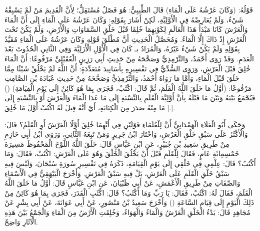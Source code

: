 قَوْلُهُ: (وَكَانَ عَرْشُهُ عَلَى الْمَاءِ) قَالَ الطِّيبِيُّ: هُوَ فَصْلٌ مُسْتَقِلٌّ؛ لِأَنَّ الْقَدِيمَ مَنْ لَمْ يَسْبِقْهُ شَيْءٌ، وَلَمْ يُعَارِضْهُ فِي الْأَوَّلِيَّةِ، لَكِنْ أَشَارَ بِقَوْلِهِ: وَكَانَ عَرْشُهُ عَلَى الْمَاءِ إِلَى أَنَّ الْمَاءَ وَالْعَرْشَ كَانَا مَبْدَأُ هَذَا الْعَالَمِ لِكَوْنِهِمَا خُلِقَا قَبْلَ خَلْقِ السَّمَاوَاتِ وَالْأَرْضِ، وَلَمْ يَكُنْ تَحْتَ الْعَرْشِ إِذْ ذَاكَ إِلَّا الْمَاءُ. وَمُحَصَّلُ الْحَدِيثِ أَنَّ مُطْلَقَ قَوْلِهِ وَكَانَ عَرْشُهُ عَلَى الْمَاءِ مُقَيَّدٌ بِقَوْلِهِ وَلَمْ يَكُنْ شَيْءٌ غَيْرُهُ، وَالْمُرَادُ بـ كَانَ فِي الْأَوَّلِ الْأَزَلِيَّةَ وَفِي الثَّانِيِ الْحُدُوثَ بَعْدَ الْعَدَمِ. وَقَدْ رَوَى أَحْمَدُ، وَالتِّرْمِذِيُّ وَصَحَّحَهُ مِنْ حَدِيثِ أَبِي رَزِينٍ الْعُقَيْلِيِّ مَرْفُوعًا: أَنَّ الْمَاءَ خُلِقَ قَبْلَ الْعَرْشِ، وَرَوَى السُّدِّيُّ فِي تَفْسِيرِهِ بِأَسَانِيدَ مُتَعَدِّدَةٍ: أَنَّ اللَّهَ لَمْ يَخْلُقْ شَيْئًا مِمَّا خَلَقَ قَبْلَ الْمَاءِ، وَأَمَّا مَا رَوَاهُ أَحْمَدُ، وَالتِّرْمِذِيُّ وَصَحَّحَهُ مِنْ حَدِيثِ عُبَادَةَ بْنِ الصَّامِتِ مَرْفُوعًا: (أَوَّلُ مَا خَلَقَ اللَّهُ الْقَلَمَ، ثُمَّ قَالَ: اكْتُبْ، فَجَرَى بِمَا هُوَ كَائِنٌ إِلَى يَوْمِ الْقِيَامَةِ) () فَيُجْمَعُ بَيْنَهُ وَبَيْنَ مَا قَبْلَهُ بِأَنَّ أَوَّلِيَّةَ الْقَلَمِ بِالنِّسْبَةِ إِلَى مَا عَدَا الْمَاءَ وَالْعَرْشَ أَوْ بِالنِّسْبَةِ إِلَى مَا مِنْهُ صَدَرَ مِنَ الْكِتَابَةِ، أَيْ أَنَّهُ قِيلَ لَهُ اكْتُبْ أَوَّلَ مَا خُلِقَ [.].

وَحَكَى أَبُو الْعَلَاءِ الْهَمْدَانِيُّ أَنَّ لِلْعُلَمَاءِ قَوْلَيْنِ فِي أَيِّهِمَا خُلِقَ أَوَّلًا الْعَرْشُ أَوِ الْقَلَمُ؟ قَالَ: وَالْأَكْثَرُ عَلَى سَبْقِ خَلْقِ الْعَرْشِ، وَاخْتَارَ ابْنُ جَرِيرٍ وَمَنْ تَبِعَهُ الثَّانِي، وَرَوَى ابْنُ أَبِي حَازِمٍ مِنْ طَرِيقِ سَعِيدِ بْنِ جُبَيْرٍ، عَنِ ابْنِ عَبَّاسٍ قَالَ: خَلَقَ اللَّهُ اللَّوْحَ الْمَحْفُوظَ مَسِيرَةَ خَمْسِمِائَةِ عَامٍ، فَقَالَ لِلْقَلَمِ قَبْلَ أَنْ يَخْلُقَ الْخَلْقَ وَهُوَ عَلَى الْعَرْشِ: اكْتُبْ، فَقَالَ: وَمَا أَكْتُبُ؟ قَالَ: عِلْمِي فِي خَلْقِي إِلَى يَوْمِ الْقِيَامَةِ، ذَكَرَهُ فِي تَفْسِيرِ سُورَةِ سُبْحَانَ، وَلَيْسَ فِيهِ سَبْقُ خَلْقِ الْقَلَمِ عَلَى الْعَرْشِ، بَلْ فِيهِ سَبْقُ الْعَرْشِ. وَأَخْرَجَ الْبَيْهَقِيُّ فِي الْأَسْمَاءِ وَالصِّفَاتِ مِنْ طَرِيقِ الْأَعْمَشِ، عَنْ أَبِي ظَبْيَانَ، عَنِ ابْنِ عَبَّاسٍ قَالَ: أَوَّلُ مَا خَلَقَ اللَّهُ الْقَلَمَ، فَقَالَ لَهُ: اكْتُبْ، فَقَالَ: يَا رَبِّ وَمَا أَكْتُبُ؟ قَالَ: اكْتُبِ الْقَدَرَ، فَجَرَى بِمَا هُوَ كَائِنٌ مِنْ ذَلِكَ الْيَوْمِ إِلَى قِيَامِ السَّاعَةِ () وَأَخْرَجَ سَعِيدُ بْنُ مَنْصُورٍ، عَنْ أَبِي عَوَانَةَ، عَنْ أَبِي بِشْرٍ عَنْ مُجَاهِدٍ قَالَ: بَدْءُ الْخَلْقِ الْعَرْشُ وَالْمَاءُ وَالْهَوَاءُ، وَخُلِقَتِ الْأَرْضُ مِنَ الْمَاءِ وَالْجَمْعُ بَيْنَ هَذِهِ الْآثَارِ وَاضِحٌ.


